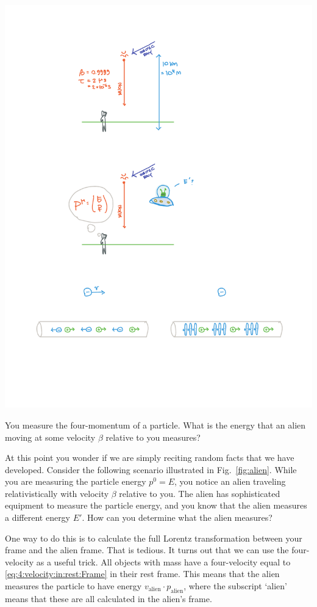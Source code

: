 \documentclass[12pt, oneside]{report}    %
\begin{document}
\begin{marginfigure}%
    \centering
    \includegraphics[width=\textwidth]{figures/alien.pdf}
    \caption{You measure the four-momentum of a particle. What is the energy that an alien moving at some velocity $\beta$ relative to you measures?\label{fig:alien}}
\end{marginfigure}

At this point you wonder if we are simply reciting random facts that we have developed. Consider the following scenario illustrated in Fig.~\ref{fig:alien}.
%
% 
While you are measuring the particle energy $p^0 = E$, you notice an alien traveling relativistically with velocity $\beta$ relative to you. The alien has sophisticated equipment to measure the particle energy, and you know that the alien measures a different energy $E'$. How can you determine what the alien measures?

One way to do this is to calculate the full Lorentz transformation between your frame and the alien frame. That is tedious. It turns out that we can use the four-velocity as a useful trick. All objects with mass have a four-velocity equal to \eqref{eq:4:velocity:in:rest:Frame} in their rest frame. This means that the alien measures the particle to have energy $v_\text{alien}\cdot p_\text{alien}$, where the subscript `alien' means that these are all calculated in the alien's frame.
\end{document}
